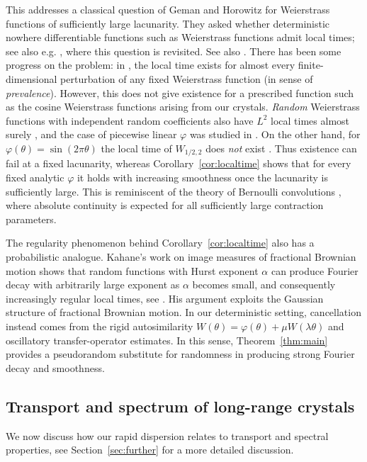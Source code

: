 \documentclass[11pt]{amsart}
\theoremstyle{plain}
\theoremstyle{definition}
\numberwithin{equation}{section}
\begin{document}
This addresses a classical question of Geman and Horowitz \cite{GemanHorowitz} for Weierstrass functions of sufficiently large lacunarity. They asked whether deterministic nowhere differentiable functions such as Weierstrass functions admit local times; see also e.g. \cite{FoucheMukeru,HarangLing,ImkellerEtAl,ImkellerPamen,Buc}, where this question is revisited. See also \cite{Rezakhanlou}. There has been some progress on the problem: in \cite{BKM}, the local time exists for almost every finite-dimensional perturbation of any fixed Weierstrass function (in sense of \textit{prevalence}). However, this does not give existence for a prescribed function such as the cosine Weierstrass functions arising from our crystals. \textit{Random} Weierstrass functions with independent random coefficients also have $L^2$ local times almost surely \cite{Romanowska}, and the case of piecewise linear $\varphi$ was studied in \cite{ImkellerPamen}. On the other hand, for $\varphi(\theta)=\sin(2\pi\theta)$ the local time of $W_{1/2,2}$ does \textit{not} exist \cite{Buc}. Thus existence can fail at a fixed lacunarity, whereas Corollary~\ref{cor:localtime} shows that for every fixed analytic $\varphi$ it holds with increasing smoothness once the lacunarity is sufficiently large. This is reminiscent of the theory of Bernoulli convolutions \cite{Solomyak,Hochman,Shmerkin,Varju}, where absolute continuity is expected for all sufficiently large contraction parameters. 

The regularity phenomenon behind Corollary~\ref{cor:localtime} also has a probabilistic analogue. Kahane's work on image measures of fractional Brownian motion shows that random functions with Hurst exponent $\alpha$ can produce Fourier decay with arbitrarily large exponent as $\alpha$ becomes small, and consequently increasingly regular local times, see \cite{Kahane}. His argument exploits the Gaussian structure of fractional Brownian motion. In our deterministic setting, cancellation instead comes from the rigid autosimilarity $W(\theta)=\varphi(\theta)+\mu W(\lambda\theta)$ and oscillatory transfer-operator estimates. In this sense, Theorem~\ref{thm:main} provides a pseudorandom substitute for randomness in producing strong Fourier decay and smoothness.

\subsection{Transport and spectrum of long-range crystals}

We now discuss how our rapid dispersion relates to transport and spectral properties, see Section~\ref{sec:further} for a more detailed discussion.
\end{document}

